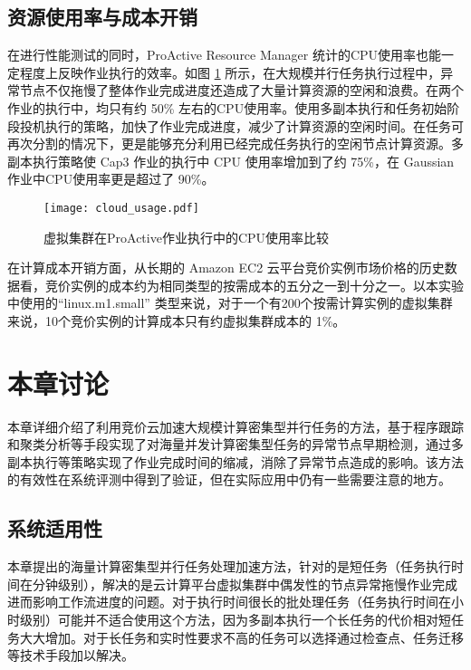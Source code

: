 \subsection{资源使用率与成本开销}
\label{sec:no2_usage}
在进行性能测试的同时，ProActive Resource Manager 统计的CPU使用率也能一定程度上反映作业执行的效率。如图 \ref{figure:resourceusage_cloud} 所示，在大规模并行任务执行过程中，异常节点不仅拖慢了整体作业完成进度还造成了大量计算资源的空闲和浪费。在两个作业的执行中，均只有约 50\% 左右的CPU使用率。使用多副本执行和任务初始阶段投机执行的策略，加快了作业完成进度，减少了计算资源的空闲时间。在任务可再次分割的情况下，更是能够充分利用已经完成任务执行的空闲节点计算资源。多副本执行策略使 Cap3 作业的执行中 CPU 使用率增加到了约 75\%，在 Gaussian 作业中CPU使用率更是超过了 90\%。
\begin{figure}
  \centering
  \texttt{[image: cloud\_usage.pdf]}
  \caption{虚拟集群在ProActive作业执行中的CPU使用率比较}
  \label{figure:resourceusage_cloud}
\end{figure}

在计算成本开销方面，从长期的 Amazon EC2 云平台竞价实例市场价格的历史数据看，竞价实例的成本约为相同类型的按需成本的五分之一到十分之一。以本实验中使用的``linux.m1.small'' 类型来说，对于一个有200个按需计算实例的虚拟集群来说，10个竞价实例的计算成本只有约虚拟集群成本的 1\%。

\section{本章讨论}
本章详细介绍了利用竞价云加速大规模计算密集型并行任务的方法，基于程序跟踪和聚类分析等手段实现了对海量并发计算密集型任务的异常节点早期检测，通过多副本执行等策略实现了作业完成时间的缩减，消除了异常节点造成的影响。该方法的有效性在系统评测中得到了验证，但在实际应用中仍有一些需要注意的地方。

\subsection{系统适用性}
本章提出的海量计算密集型并行任务处理加速方法，针对的是短任务（任务执行时间在分钟级别），解决的是云计算平台虚拟集群中偶发性的节点异常拖慢作业完成进而影响工作流进度的问题。对于执行时间很长的批处理任务（任务执行时间在小时级别）可能并不适合使用这个方法，因为多副本执行一个长任务的代价相对短任务大大增加。对于长任务和实时性要求不高的任务可以选择通过检查点、任务迁移等技术手段加以解决。


